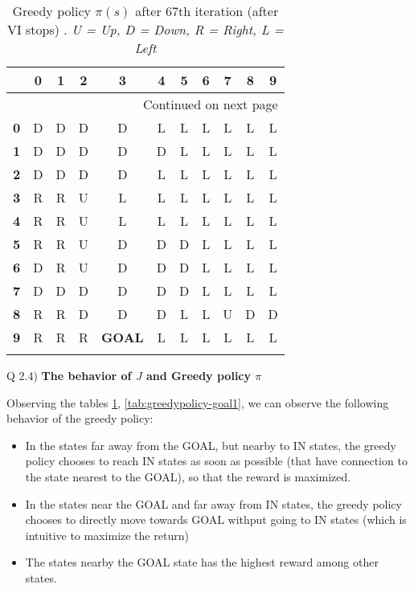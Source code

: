 \documentclass{article}
\begin{document}
\begin{longtable}{|c|c|c|c|c|c|c|c|c|c|c|}
\toprule
{} &  0 &  1 &  2 &  3 &  4 &  5 &  6 &  7 &  8 &  9 \\
\midrule
\endhead
\midrule
\multicolumn{11}{r}{{Continued on next page}} \\
\midrule
\endfoot

\bottomrule
\endlastfoot
\textbf{0} &  D &  D &  D &  D &  L &  L &  L &  L &  L &  L \\\hline
\textbf{1} &  D &  D &  D &  D &  D &  L &  L &  L &  L &  L \\\hline
\textbf{2} &  D &  D &  D &  D &  L &  L &  L &  L &  L &  L \\\hline
\textbf{3} &  R &  R &  U &  L &  L &  L &  L &  L &  L &  L \\\hline
\textbf{4} &  R &  R &  U &  L &  L &  L &  L &  L &  L &  L \\\hline
\textbf{5} &  R &  R &  U &  D &  D &  D &  L &  L &  L &  L \\\hline
\textbf{6} &  D &  R &  U &  D &  D &  D &  L &  L &  L &  L \\\hline
\textbf{7} &  D &  D &  D &  D &  D &  D &  L &  L &  L &  L \\\hline
\textbf{8} &  R &  R &  D &  D &  D &  L &  L &  U &  D &  D \\\hline
\textbf{9} &  R &  R &  R &  \textbf{GOAL} &  L &  L &  L &  L &  L &  L \\\hline
\caption{Greedy policy $\pi(s)$ after 67th iteration (after VI stops) \label{tab:greedypolicy-goal2}. \textit{U = Up, D = Down, R = Right, L = Left}}
\end{longtable}

Q 2.4) \textbf{The behavior of $J$ and Greedy policy $\pi$}

Observing the tables \ref{tab:greedypolicy-goal2}, \ref{tab:greedypolicy-goal1}, we can observe the following behavior of the greedy policy:

\begin{itemize}
    \item In the states far away from the GOAL, but nearby to IN states, the greedy policy chooses to reach IN states as soon as possible (that have connection to the state nearest to the GOAL), so that the reward is maximized.
    
    \item In the states near the GOAL and far away from IN states, the greedy policy chooses to directly move towards GOAL withput going to IN states (which is intuitive to maximize the return)
    
    \item The states nearby the GOAL state has the highest reward among other states.
\end{itemize}
\end{document}
